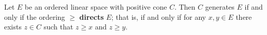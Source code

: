 Let $E$ be an ordered linear space with positive cone $C$. Then $C$ generates $E$ if and only if the ordering $\geq$ \textbf{directs} $E$; that is, if and only if for any $x, y \in E$ there exists $z \in C$ such that $z \geq x$ and $z \geq y$.
